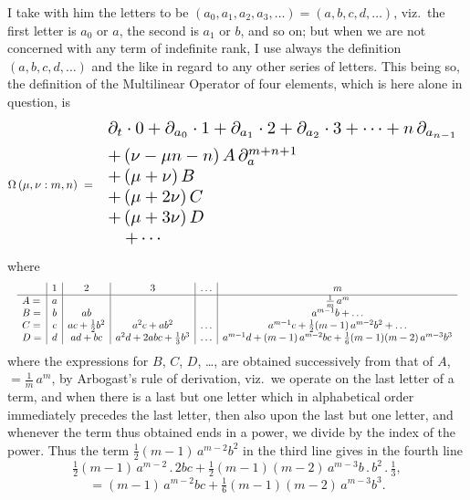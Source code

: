 \documentclass[11pt]{article}
\begin{document}
I take with him the letters to be $(a_0, a_1, a_2, a_3, \ldots) = (a, b, c, d, \ldots)$, viz.\ the first letter is $a_0$ or $a$, the second is $a_1$ or $b$, and so on; but when we are not concerned with any term of indefinite rank, I use always the definition $(a, b, c, d, \ldots)$ and the like in regard to any other series of letters. This being so, the definition of the Multilinear Operator of four elements, which is here alone in question, is
\[
\Omega\,(\mu, \nu : m, n) \;=\; \resizebox{0.92\textwidth}{!}{$\displaystyle
\begin{array}{l}
\partial_t \cdot 0 + \partial_{a_0}\cdot 1 + \partial_{a_1}\cdot 2 + \partial_{a_2}\cdot 3 + \cdots + n\,\partial_{a_{n-1}} \\[4pt]
+\, (\nu - \mu n - n)\,A\,\partial_a^{m+n+1} \\
+\, (\mu + \nu)\,B \\
+\, (\mu + 2\nu)\,C \\
+\, (\mu + 3\nu)\,D \\
\quad + \cdots
\end{array}
$}
\]
where
\[
\resizebox{\textwidth}{!}{$\displaystyle
\begin{array}{l|c|c|c|c|c}
 & 1 & 2 & 3 & \ldots & m \\
\hline
A = & a & & & & \tfrac{1}{m}\,a^m \\
B = & b & a b & & & a^{m-1} b + \ldots \\
C = & c & a c + \tfrac{1}{2} b^2 & a^2 c + a b^2 & \ldots & a^{m-1} c + \tfrac{1}{2}(m-1)\,a^{m-2} b^2 + \ldots \\
D = & d & a d + b c & a^2 d + 2 a b c + \tfrac{1}{3} b^3 & \ldots & a^{m-1} d + (m-1)\,a^{m-2} b c + \tfrac{1}{6}(m-1)(m-2)\,a^{m-3} b^3
\end{array}$}
\]
where the expressions for $B$, $C$, $D$, \ldots, are obtained successively from that of $A$, $= \tfrac{1}{m}\,a^m$, by Arbogast's rule of derivation, viz.\ we operate on the last letter of a term, and when there is a last but one letter which in alphabetical order immediately precedes the last letter, then also upon the last but one letter, and whenever the term thus obtained ends in a power, we divide by the index of the power. Thus the term $\tfrac{1}{2}(m-1)\,a^{m-2} b^2$ in the third line gives in the fourth line
\[
\tfrac{1}{2}(m-1)\,a^{m-2}\,.\,2 b c + \tfrac{1}{2}(m-1)(m-2)\,a^{m-3} b\,.\,b^2\,.\,\tfrac{1}{3},
\]
\[
= (m-1)\,a^{m-2} b c + \tfrac{1}{6}(m-1)(m-2)\,a^{m-3} b^3.
\]
\end{document}
